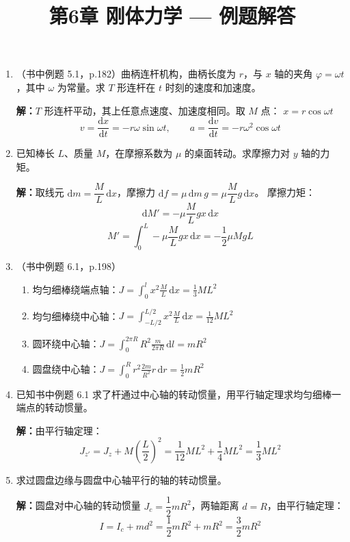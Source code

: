 \documentclass{ctexart}
\title{\textbf{第6章 刚体力学} --- 例题解答}
\author{}
\date{}
\begin{document}
\maketitle

\begin{enumerate}

\item（书中例题 5.1，p.182）曲柄连杆机构，曲柄长度为 $r$，与 $x$ 轴的夹角 $\varphi = \omega t$，其中 $\omega$ 为常量。求 $T$ 形连杆在 $t$ 时刻的速度和加速度。

\textbf{解：}$T$ 形连杆平动，其上任意点速度、加速度相同。取 $M$ 点：
$x = r\cos\omega t$
\[
v = \frac{\mathrm{d}x}{\mathrm{d}t} = -r\omega\sin\omega t,\qquad
a = \frac{\mathrm{d}v}{\mathrm{d}t} = -r\omega^{2}\cos\omega t
\]

\item 已知棒长 $L$、质量 $M$，在摩擦系数为 $\mu$ 的桌面转动。求摩擦力对 $y$ 轴的力矩。

\textbf{解：}取线元 $\mathrm{d}m = \dfrac{M}{L}\,\mathrm{d}x$，摩擦力 $\mathrm{d}f = \mu\,\mathrm{d}m\,g = \mu\dfrac{M}{L}g\,\mathrm{d}x$。
摩擦力矩：
\[
\mathrm{d}M' = -\mu\frac{M}{L}gx\,\mathrm{d}x
\]
\[
M' = \int_{0}^{L} -\mu\frac{M}{L}gx\,\mathrm{d}x = -\frac12\mu MgL
\]

\item（书中例题 6.1，p.198）
\begin{enumerate}
  \item 均匀细棒绕端点轴：$J = \displaystyle\int_{0}^{l} x^{2}\frac{M}{L}\,\mathrm{d}x = \frac13 ML^{2}$
  \item 均匀细棒绕中心轴：$J = \displaystyle\int_{-L/2}^{L/2} x^{2}\frac{M}{L}\,\mathrm{d}x = \frac{1}{12} ML^{2}$
  \item 圆环绕中心轴：$J = \displaystyle\int_{0}^{2\pi R} R^{2}\frac{m}{2\pi R}\,\mathrm{d}l = mR^{2}$
  \item 圆盘绕中心轴：$J = \displaystyle\int_{0}^{R} r^{2}\frac{2m}{R^{2}}r\,\mathrm{d}r = \frac12 mR^{2}$
\end{enumerate}

\item 已知书中例题 6.1 求了杆通过中心轴的转动惯量，用平行轴定理求均匀细棒一端点的转动惯量。

\textbf{解：}由平行轴定理：
\[
J_{z'} = J_z + M\left(\frac{L}{2}\right)^{2}
= \frac{1}{12}ML^{2} + \frac14 ML^{2} = \frac13 ML^{2}
\]

\item 求过圆盘边缘与圆盘中心轴平行的轴的转动惯量。

\textbf{解：}圆盘对中心轴的转动惯量 $J_c = \dfrac12 mR^{2}$，两轴距离 $d = R$，由平行轴定理：
\[
I = I_c + md^{2} = \frac12 mR^{2} + mR^{2} = \frac32 mR^{2}
\]


\end{enumerate}
\end{document}
